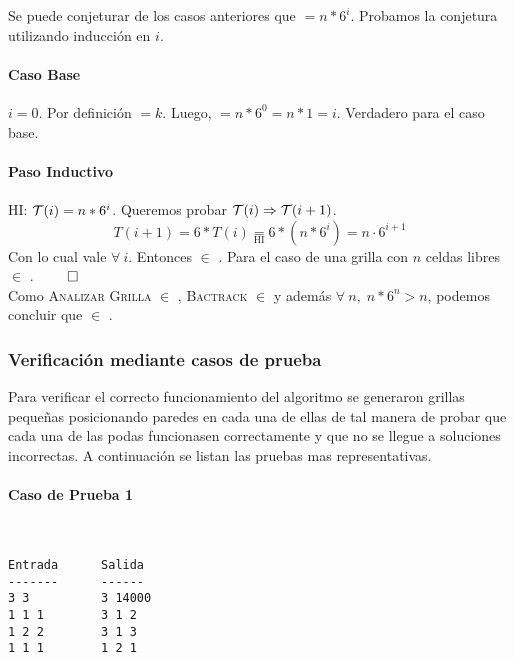 \documentclass[11pt, a4paper, twoside]{article}
\begin{document}
Se puede conjeturar de los casos anteriores que  $= n * 6^{i}$.
Probamos la conjetura utilizando inducción en $i$. 

\paragraph*{Caso Base} $i=0$. Por definición  $= k$. Luego,  $= n * 6^{0} = n * 1 = i$. Verdadero para el caso base.

\paragraph*{Paso Inductivo} HI: $\mathop{}\mathopen{}\mathcal{T}\mathopen{}\left(i\right) = n * 6^{i}$.
Queremos probar $\mathop{}\mathopen{}\mathcal{T}\mathopen{}\left(i\right) \Rightarrow \mathop{}\mathopen{}\mathcal{T}\mathopen{}\left(i+1\right)$. 
\[
	T(i+1) = 6 * T(i) \underset{\text{HI}}{=} 6 * (n * 6^{i}) = n \cdot 6^{i+1}
\]
Con lo cual  vale $\forall \ i$. Entonces  $\in$ .
Para el caso de una grilla con $n$ celdas libres  $\in$ . $\qed$ \\

Como \textsc{Analizar Grilla} $\in$ , \textsc{Bactrack} $\in$ 
y además $\forall \ n, \; n * 6^n > n$, podemos concluir que  $\in$ .

\subsubsection{Verificación mediante casos de prueba}

Para verificar el correcto funcionamiento del algoritmo se generaron grillas
pequeñas posicionando paredes en cada una de ellas de tal manera de probar
que cada una de las podas funcionasen correctamente y que no se llegue
a soluciones incorrectas. A continuación se listan las pruebas mas representativas.

\paragraph{Caso de Prueba 1}\mbox{}\\

\begin{verbatim}
Entrada      Salida
-------      ------
3 3          3 14000
1 1 1        3 1 2
1 2 2        3 1 3
1 1 1        1 2 1
\end{verbatim}
\end{document}
